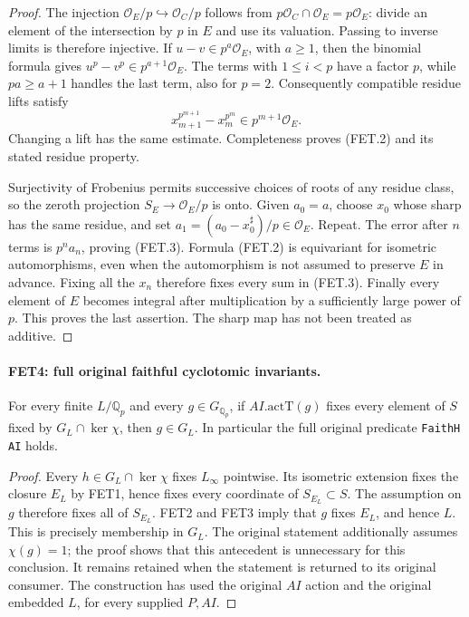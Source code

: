 \begin{proof}
The injection $\mathcal O_E/p\hookrightarrow\mathcal O_C/p$
follows from $p\mathcal O_C\cap\mathcal O_E=p\mathcal O_E$:
divide an element of the intersection by $p$ in $E$ and use its
valuation. Passing to inverse limits is therefore injective.
If $u-v\in p^a\mathcal O_E$, with $a\geq1$, then the binomial
formula gives $u^p-v^p\in p^{a+1}\mathcal O_E$. The terms with
$1\leq i<p$ have a factor $p$, while $pa\geq a+1$ handles the
last term, also for $p=2$. Consequently compatible residue lifts
satisfy
\[
 x_{m+1}^{p^{m+1}}-x_m^{p^m}\in p^{m+1}\mathcal O_E.
\]
Changing a lift has the same estimate. Completeness proves (FET.2)
and its stated residue property.

Surjectivity of Frobenius permits successive choices of roots of
any residue class, so the zeroth projection
$S_E\to\mathcal O_E/p$ is onto. Given $a_0=a$, choose $x_0$
whose sharp has the same residue, and set
$a_1=(a_0-x_0^\sharp)/p\in\mathcal O_E$. Repeat.
The error after $n$ terms is $p^n a_n$, proving (FET.3).
Formula (FET.2) is equivariant for isometric automorphisms, even
when the automorphism is not assumed to preserve $E$ in advance.
Fixing all the $x_n$ therefore fixes every sum in (FET.3).
Finally every element of $E$ becomes integral after multiplication
by a sufficiently large power of $p$. This proves the last assertion.
The sharp map has not been treated as additive.
\end{proof}

\paragraph{FET4: full original faithful cyclotomic invariants.}
\label{claim:FET4}
For every finite $L/\mathbb Q_p$ and every
$g\in G_{\mathbb Q_p}$, if $AI.\mathrm{actT}(g)$ fixes every
element of $S$ fixed by $G_L\cap\ker\chi$, then $g\in G_L$.
In particular the full original predicate \texttt{FaithH AI} holds.

\begin{proof}
Every $h\in G_L\cap\ker\chi$ fixes $L_\infty$ pointwise.
Its isometric extension fixes the closure $E_L$ by FET1, hence
fixes every coordinate of $S_{E_L}\subset S$.
The assumption on $g$ therefore fixes all of $S_{E_L}$.
FET2 and FET3 imply that $g$ fixes $E_L$, and hence $L$.
This is precisely membership in $G_L$.
The original statement additionally assumes $\chi(g)=1$; the
proof shows that this antecedent is unnecessary for this conclusion.
It remains retained when the statement is returned to its original
consumer. The construction has used the original $AI$ action and
the original embedded $L$, for every supplied $P,AI$.
\end{proof}

